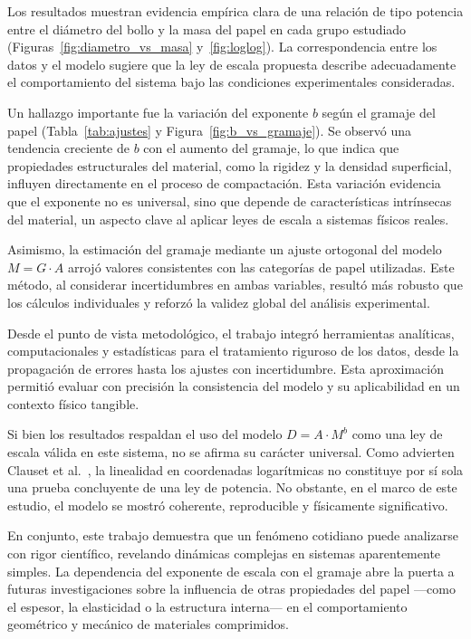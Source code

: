 \documentclass[12pt,a4]{article}
\begin{document}
Los resultados muestran evidencia empírica clara de una relación de tipo potencia entre el diámetro del bollo y la masa del papel en cada grupo estudiado (Figuras~\ref{fig:diametro_vs_masa} y~\ref{fig:loglog}). La correspondencia entre los datos y el modelo sugiere que la ley de escala propuesta describe adecuadamente el comportamiento del sistema bajo las condiciones experimentales consideradas.

Un hallazgo importante fue la variación del exponente \( b \) según el gramaje del papel (Tabla~\ref{tab:ajustes} y Figura~\ref{fig:b_vs_gramaje}). Se observó una tendencia creciente de \( b \) con el aumento del gramaje, lo que indica que propiedades estructurales del material, como la rigidez y la densidad superficial, influyen directamente en el proceso de compactación. Esta variación evidencia que el exponente no es universal, sino que depende de características intrínsecas del material, un aspecto clave al aplicar leyes de escala a sistemas físicos reales.

Asimismo, la estimación del gramaje mediante un ajuste ortogonal del modelo \( M = G \cdot A \) arrojó valores consistentes con las categorías de papel utilizadas. Este método, al considerar incertidumbres en ambas variables, resultó más robusto que los cálculos individuales y reforzó la validez global del análisis experimental.

Desde el punto de vista metodológico, el trabajo integró herramientas analíticas, computacionales y estadísticas para el tratamiento riguroso de los datos, desde la propagación de errores hasta los ajustes con incertidumbre. Esta aproximación permitió evaluar con precisión la consistencia del modelo y su aplicabilidad en un contexto físico tangible.

Si bien los resultados respaldan el uso del modelo \( D = A \cdot M^b \) como una ley de escala válida en este sistema, no se afirma su carácter universal. Como advierten Clauset et al.~\cite{clauset}, la linealidad en coordenadas logarítmicas no constituye por sí sola una prueba concluyente de una ley de potencia. No obstante, en el marco de este estudio, el modelo se mostró coherente, reproducible y físicamente significativo.

En conjunto, este trabajo demuestra que un fenómeno cotidiano puede analizarse con rigor científico, revelando dinámicas complejas en sistemas aparentemente simples. La dependencia del exponente de escala con el gramaje abre la puerta a futuras investigaciones sobre la influencia de otras propiedades del papel —como el espesor, la elasticidad o la estructura interna— en el comportamiento geométrico y mecánico de materiales comprimidos.
\end{document}
